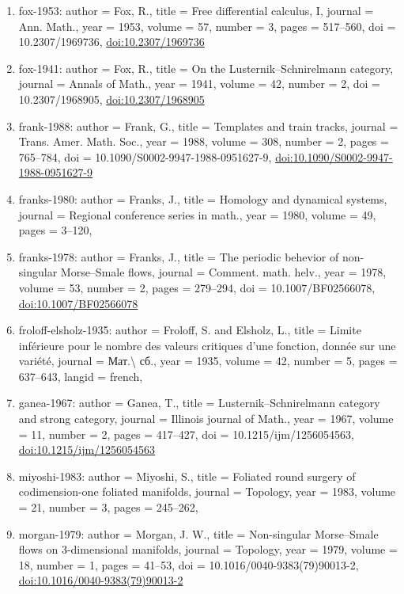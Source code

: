 \documentclass[11pt]{article}
\begin{document}
\begin{enumerate}[leftmargin=*]
  \item fox-1953: author = Fox, R., title = Free differential calculus, I, journal = Ann. Math., year = 1953, volume = 57, number = 3, pages = 517--560, doi = 10.2307/1969736, \href{https://doi.org/10.2307/1969736}{doi:10.2307/1969736}
  \item fox-1941: author = Fox, R., title = On the Lusternik--Schnirelmann category, journal = Annals of Math., year = 1941, volume = 42, number = 2, doi = 10.2307/1968905, \href{https://doi.org/10.2307/1968905}{doi:10.2307/1968905}
  \item frank-1988: author = Frank, G., title = Templates and train tracks, journal = Trans. Amer. Math. Soc., year = 1988, volume = 308, number = 2, pages = 765--784, doi = 10.1090/S0002-9947-1988-0951627-9, \href{https://doi.org/10.1090/S0002-9947-1988-0951627-9}{doi:10.1090/S0002-9947-1988-0951627-9}
  \item franks-1980: author = Franks, J., title = Homology and dynamical systems, journal = Regional conference series in math., year = 1980, volume = 49, pages = 3--120,
  \item franks-1978: author = Franks, J., title = The periodic behevior of non-singular Morse--Smale flows, journal = Comment. math. helv., year = 1978, volume = 53, number = 2, pages = 279--294, doi = 10.1007/BF02566078, \href{https://doi.org/10.1007/BF02566078}{doi:10.1007/BF02566078}
  \item froloff-elsholz-1935: author = Froloff, S. and Elsholz, L., title = Limite inférieure pour le nombre des valeurs critiques d'une fonction, donnée sur une variété, journal = Мат.\textbackslash{} сб., year = 1935, volume = 42, number = 5, pages = 637--643, langid = french,
  \item ganea-1967: author = Ganea, T., title = Lusternik--Schnirelmann category and strong category, journal = Illinois journal of Math., year = 1967, volume = 11, number = 2, pages = 417--427, doi = 10.1215/ijm/1256054563, \href{https://doi.org/10.1215/ijm/1256054563}{doi:10.1215/ijm/1256054563}
  \item miyoshi-1983: author = Miyoshi, S., title = Foliated round surgery of codimension-one foliated manifolds, journal = Topology, year = 1983, volume = 21, number = 3, pages = 245--262,
  \item morgan-1979: author = Morgan, J. W., title = Non-singular Morse--Smale flows on 3-dimensional manifolds, journal = Topology, year = 1979, volume = 18, number = 1, pages = 41--53, doi = 10.1016/0040-9383(79)90013-2, \href{https://doi.org/10.1016/0040-9383(79)90013-2}{doi:10.1016/0040-9383(79)90013-2}

\end{enumerate}
\end{document}
